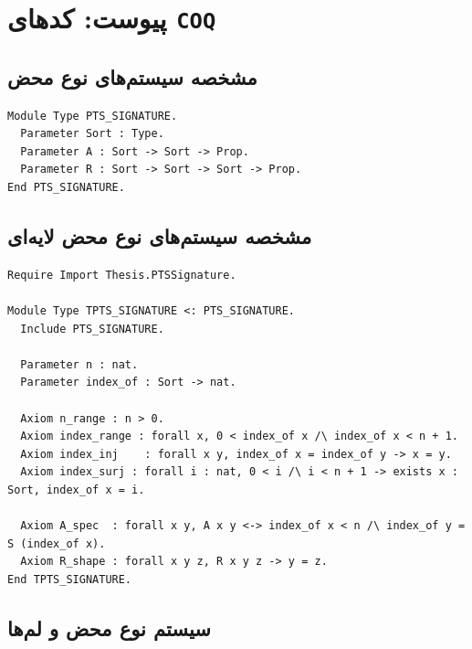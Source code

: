 \linespread{1}
\chapter*{پيوست: كدهای \texttt{COQ}}

\section*{مشخصه سیستم‌های نوع محض}

\begin{latin}
\setmonofont{DejaVu Sans Mono}
\begin{verbatim}
Module Type PTS_SIGNATURE.
  Parameter Sort : Type.
  Parameter A : Sort -> Sort -> Prop.
  Parameter R : Sort -> Sort -> Sort -> Prop.
End PTS_SIGNATURE.
\end{verbatim}
\end{latin}

\section*{مشخصه سیستم‌های نوع محض لایه‌ای}

\begin{latin}
\setmonofont{DejaVu Sans Mono}
\begin{verbatim}
Require Import Thesis.PTSSignature.

Module Type TPTS_SIGNATURE <: PTS_SIGNATURE.
  Include PTS_SIGNATURE.

  Parameter n : nat.
  Parameter index_of : Sort -> nat.

  Axiom n_range : n > 0.
  Axiom index_range : forall x, 0 < index_of x /\ index_of x < n + 1.
  Axiom index_inj    : forall x y, index_of x = index_of y -> x = y.
  Axiom index_surj : forall i : nat, 0 < i /\ i < n + 1 -> exists x : Sort, index_of x = i.

  Axiom A_spec  : forall x y, A x y <-> index_of x < n /\ index_of y = S (index_of x).
  Axiom R_shape : forall x y z, R x y z -> y = z.
End TPTS_SIGNATURE.
\end{verbatim}
\end{latin}

\section*{سیستم‌ نوع محض و لم‌ها}


